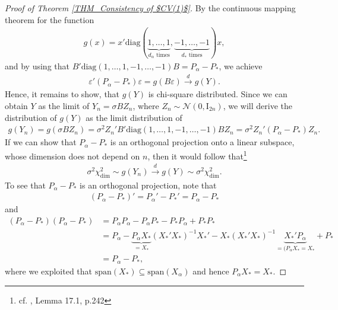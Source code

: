 \documentclass[Research_Module_ES.tex]{subfiles}
\begin{document}
\begin{proof}[Proof of Theorem \ref{THM_Consistency of $CV(1)$}]
By the continuous mapping theorem for the function
\begin{align*}
g(x) = x'\mathrm{diag}(\underbrace{1,\dots,1}_{\textrm{$d_\alpha$ times}},\underbrace{-1,\dots,-1}_{\textrm{$d_\ast$ times}})x,
\end{align*}
and by using that $B'\mathrm{diag}(1,\dots,1,-1,\dots,-1)B=P_\alpha-P_\ast$, we achieve 
\begin{align*}
\varepsilon'(P_\alpha-P_\ast)\varepsilon = g(B\varepsilon) \overset{d}{\longrightarrow} g(Y).
\end{align*}
Hence, it remains to show, that $g(Y)$ is chi-square distributed. 
Since we can obtain $Y$ as the limit of $Y_n=\sigma BZ_n$, where $Z_n\sim \mathcal{N}(0,\mathrm{I}_{2n})$, we will derive the distribution of $g(Y)$ as the limit distribution of 
\begin{align*}
g(Y_n) = g(\sigma BZ_n) = \sigma ^2 Z_n'B'\mathrm{diag}(1,\dots,1,-1,\dots,-1)BZ_n %
= \sigma^2 Z_n'(P_\alpha-P_\ast)Z_n.
\end{align*}
If we can show that $P_\alpha-P_\ast$ is an orthogonal projection onto a linear subspace, whose dimension does not depend on $n$, then it would follow that\footnote{cf. \cite{vandervaart}, Lemma 17.1, p.242}
\begin{align}
\sigma^2\chi_{\mathrm{dim}}^2 \sim g(Y_n) \overset{d}{\longrightarrow}g(Y) \sim \sigma^2\chi_{\mathrm{dim}}^2.\label{lim_dist}
\end{align}
To see that $P_\alpha-P_\ast$ is an orthogonal projection, note that
\begin{align}
(P_\alpha-P_\ast)' = P_\alpha'-P_\ast'=P_\alpha-P_\ast \label{projection_start}
\end{align}
and 
\begin{align}
(P_\alpha-P_\ast)(P_\alpha-P_\ast) 
&= P_\alpha P_\alpha-P_\alpha P_\ast-P_\ast P_\alpha+P_\ast P_\ast \nonumber\\
&=P_\alpha - \underbrace{P_\alpha X_\ast}_{=X_\ast}(X_\ast'X_\ast)^{-1}X_\ast' - X_\ast (X_\ast'X_\ast)^{-1}\underbrace{X_\ast'P_\alpha}_{=(P_\alpha X_\ast=X_\ast} +P_\ast\\
&=P_\alpha-P_\ast,\nonumber
\end{align}
where we exploited that $\mathrm{span}(X_\ast)\subseteq \mathrm{span} (X_\alpha)$ and hence $P_\alpha X_\ast=X_\ast$.


\end{proof}
\end{document}
